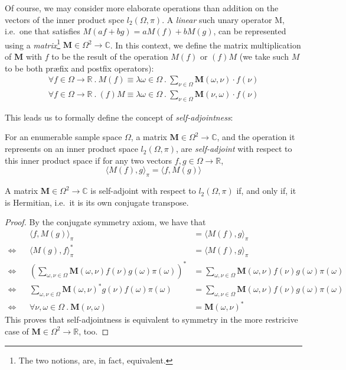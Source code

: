 	Of course, we may consider more elaborate operations than addition on the vectors of the
	inner product spce $l_2(\Omega, \pi)$. A \emph{linear} such unary operator M, i.e.\ one 
	that satisfies $M (a f + b g) = a M(f) + b M(g)$, can be represented using a 
	\emph{matrix}\footnote{The two notions, are, in fact, equivalent.}
	$\mathbf{M} \in \Omega^2 \rightarrow \mathbb{C}$. In this context, we define the matrix 
	multiplication of $\mathbf{M}$ with $f$ to be the result of the operation $M(f)$ or $(f)M$ 
	(we take such $M$ to be both pr{\ae}fix and postfix operators):
	\begin{align*}
		\forall f \in\Omega\rightarrow\mathbb{R}\ .\  M(f)\equiv\lambda \omega\in\Omega\ .\ 
		\sum_{\nu\in\Omega} \mathbf{M}(\omega, \nu) \cdot f(\nu) \\
		\forall f \in\Omega\rightarrow\mathbb{R}\ .\ (f)M\equiv\lambda \omega\in\Omega\ .\ 
		\sum_{\nu\in\Omega} \mathbf{M}(\nu, \omega) \cdot f(\nu)
	\end{align*}

	This leads us to formally define the concept of \emph{self-adjointness}:
	\begin{definition}
		For an enumerable sample space $\Omega$, a matrix $\mathbf{M} \in \Omega^2 
		\rightarrow \mathbb{C}$, and the operation it represents on an inner product space 
		$l_2(\Omega, \pi)$, are \emph{self-adjoint} with respect to this inner product 
		space if for any two vectors $f, g\in \Omega\rightarrow\mathbb{R}$, 
		$$		
			\langle M(f), g \rangle_\pi = \langle f, M(g) \rangle
		$$
	\end{definition}
	\begin{lemma}
		A matrix $\mathbf{M}\in\Omega^2\rightarrow\mathbb{C}$ is self-adjoint with respect
		to $l_2(\Omega, \pi)$ if, and only if, it is Hermitian, i.e.\ it is its
		own conjugate transpose.
	\end{lemma}
	\begin{proof}
		By the conjugate symmetry axiom, we have that
		\begin{align*}
			&& \langle f, M(g) \rangle_\pi &= \langle M(f) , g \rangle_\pi  \\
			\iff&& 
			\langle M(g), f\rangle_\pi^* &= \langle M(f),g\rangle_\pi 
			\\
			\iff&& 
			\left(
			\sum_{\omega,\nu\in\Omega}\mathbf{M}(\omega,\nu)f(\nu)g(\omega)\pi(\omega)
			\right)^*
			&=\sum_{\omega,\nu\in\Omega}
			\mathbf{M}(\omega,\nu)f(\nu)g(\omega)\pi(\omega) \\
			\iff&&  
			\sum_{\omega,\nu\in\Omega}
			\mathbf{M}(\omega,\nu)^*g(\nu)f(\omega)\pi(\omega) &=
			\sum_{\omega,\nu\in\Omega}
			\mathbf{M}(\omega,\nu)f(\nu)g(\omega)\pi(\omega)
			\\
			\iff&& 
			\forall \nu,\omega \in \Omega\ .\ 
			\mathbf{M}(\nu,\omega) &= \mathbf{M}(\omega,\nu)^*
		\end{align*}
		This proves that self-adjointness is equivalent to symmetry in the more restricive
		case of $\mathbf{M}\in\Omega^2\rightarrow\mathbb{R}$, too.
	\end{proof}

